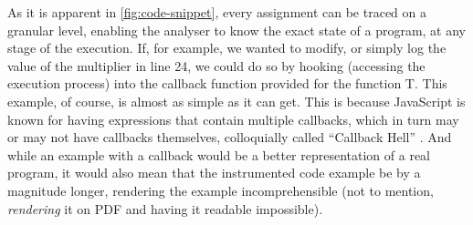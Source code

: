 As it is apparent in \autoref{fig:code-snippet}, every assignment can be traced on a granular level, enabling the analyser to know the exact state of a program, at any stage of the execution. 
If, for example, we wanted to modify, or simply log the value of the multiplier in line 24, we could do so by hooking (accessing the execution process) into the callback function provided for the function T.
This example, of course, is almost as simple as it can get. This is because JavaScript is known for having expressions that contain multiple callbacks, which in turn may or may not have callbacks themselves, colloquially called “Callback Hell” \cite{max_ogden_callback_2019}. And while an example with a callback would be a better representation of a real program, it would also mean that the instrumented code example be by a magnitude longer, rendering the example incomprehensible (not to mention, \textit{rendering} it on PDF and having it readable impossible). \\


